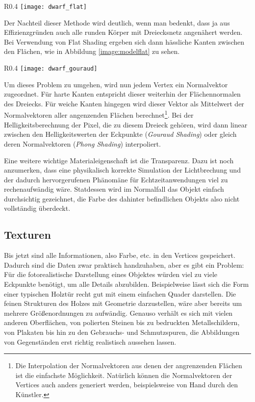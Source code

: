 \begin{wrapfigure}{R}{0.4\textwidth}
  \texttt{[image: dwarf\_flat]}
  \label{image:modelflat}
  \vspace{-10pt}
  \caption{Flat Shading.}
\end{wrapfigure}

Der Nachteil dieser Methode wird deutlich, wenn man bedenkt, dass ja aus Effizienzgründen auch alle runden Körper mit Dreiecksnetz angenähert werden. Bei Verwendung von Flat Shading ergeben sich dann hässliche Kanten zwischen den Flächen, wie in Abbildung \ref{image:modelflat} zu sehen.

\begin{wrapfigure}{R}{0.4\textwidth}
  \texttt{[image: dwarf\_gouraud]}
  \label{image:modelgouraud}
  \vspace{-10pt}
  \caption{Gouraud Shading.}
\end{wrapfigure}

Um dieses Problem zu umgehen, wird nun jedem Vertex ein Normalvektor zugeordnet. Für harte Kanten entspricht dieser weiterhin der Flächennormalen des Dreiecks. Für weiche Kanten hingegen wird dieser Vektor als Mittelwert der Normalvektoren aller angenzenden Flächen berechnet\footnote{Die Interpolation der Normalvektoren aus denen der angrenzenden Flächen ist die einfachste Möglichkeit. Natürlich können die Normalvektoren der Vertices auch anders generiert werden, beispielsweise von Hand durch den Künstler.}. Bei der Helligkeitsberechnung der Pixel, die zu diesem Dreieck gehören, wird dann linear zwischen den Helligkeitswerten der Eckpunkte (\emph{Gouraud Shading}) oder gleich deren Normalvektoren (\emph{Phong Shading}) interpoliert.

Eine weitere wichtige Materialeigenschaft ist die Transparenz. Dazu ist noch anzumerken, dass eine physikalisch korrekte Simulation der Lichtbrechung und der dadurch hervorgerufenen Phänomäne für Echtzeitanwendungen viel zu rechenaufwändig wäre. Statdessen wird im Normalfall das Objekt einfach durchsichtig gezeichnet, die Farbe des dahinter befindlichen Objekts also nicht vollständig überdeckt.

\subsection{Texturen}
\label{texturing}
Bis jetzt sind alle Informationen, also Farbe, etc. in den Vertices gespeichert. Dadurch sind die Daten zwar praktisch handzuhaben, aber es gibt ein Problem: Für die fotorealistische Darstellung eines Objektes würden viel zu viele Eckpunkte benötigt, um alle Details abzubilden. Beispielweise lässt sich die Form einer typischen Holztür recht gut mit einem einfachen Quader darstellen. Die feinen Strukturen des Holzes mit Geometrie darzustellen, wäre aber bereits um mehrere Größenordnungen zu aufwändig. Genauso verhält es sich mit vielen anderen Oberflächen, von polierten Steinen bis zu bedruckten Metallschildern, von Plakaten bis hin zu den Gebrauchs- und Schmutzspuren, die Abbildungen von Gegenständen erst richtig realistisch aussehen lassen.

